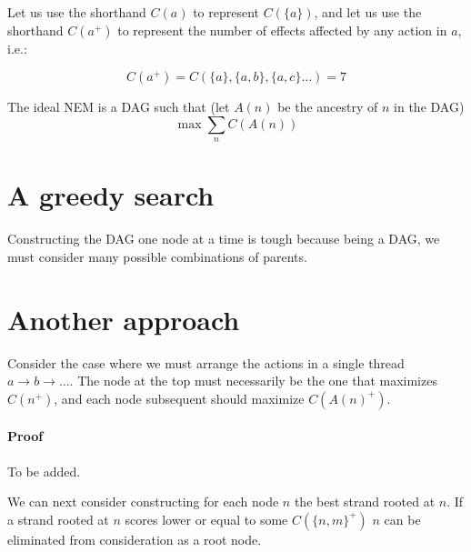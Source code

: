 \documentclass[twocolumn]{article}
\begin{document}
Let us use the shorthand $C( a )$ to represent $C( \{a\} )$, and let us use the shorthand $C( a^+ )$ to represent the number of effects affected by any action in $a$, i.e.:

\[
C( a^+ ) = C( \{a\}, \{a,b\}, \{a,c\} \ldots ) = 7
\]

The ideal NEM is a DAG such that (let $A(n)$ be the ancestry of $n$ in the DAG)
\[
\max \sum_n C( A( n ) )
\]

\section{A greedy search}

Constructing the DAG one node at a time is tough because being a DAG, we must consider many possible combinations of parents.

\section{Another approach}
Consider the case where we must arrange the actions in a single thread $a \rightarrow b \rightarrow \ldots$.
The node at the top must necessarily be the one that maximizes $C(n^+)$, and each node subsequent should maximize $C(A(n)^+)$.

\paragraph{Proof} To be added.

We can next consider constructing for each node $n$ the best strand rooted at $n$.
If a strand rooted at $n$ scores lower or equal to some $C(\{n,m\}^+)$ $n$ can be eliminated from consideration as a root node.
\end{document}

